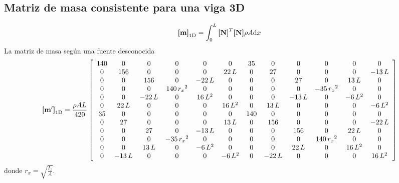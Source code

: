 \subsection*{Matriz de masa consistente para una viga 3D}
  \begin{equation}
  	\boldsymbol{[}\mathbf{m} \boldsymbol{]}_{\mathrm{1D}} = \int_0^L \boldsymbol{[}\mathbf{N} \boldsymbol{]}^T \boldsymbol{[}\mathbf{N} \boldsymbol{]} \rho A \textrm{d} x
  \end{equation}
  La matriz de masa según una fuente desconocida
  \begin{equation}
  	\boldsymbol{[}\mathbf{m'} \boldsymbol{]}_{\mathrm{1D}}= \frac{\rho A L}{420}\left[\begin{array}{cccccccccccc} 140 & 0 & 0 & 0 & 0 & 0 & 35 & 0 & 0 & 0 & 0 & 0\\ 0 & 156 & 0 & 0 & 0 & 22\,L & 0 & 27 & 0 & 0 & 0 & -13\,L\\ 0 & 0 & 156 & 0 & -22\,L & 0 & 0 & 0 & 27 & 0 & 13\,L & 0\\ 0 & 0 & 0 & 140\,{r_{x}}^2 & 0 & 0 & 0 & 0 & 0 & -35\,{r_{x}}^2 & 0 & 0\\ 0 & 0 & -22\,L & 0 & 16\,L^2 & 0 & 0 & 0 & -13\,L & 0 & -6\,L^2 & 0\\ 0 & 22\,L & 0 & 0 & 0 & 16\,L^2 & 0 & 13\,L & 0 & 0 & 0 & -6\,L^2\\ 35 & 0 & 0 & 0 & 0 & 0 & 140 & 0 & 0 & 0 & 0 & 0\\ 0 & 27 & 0 & 0 & 0 & 13\,L & 0 & 156 & 0 & 0 & 0 & -22\,L\\ 0 & 0 & 27 & 0 & -13\,L & 0 & 0 & 0 & 156 & 0 & 22\,L & 0\\ 0 & 0 & 0 & -35\,{r_{x}}^2 & 0 & 0 & 0 & 0 & 0 & 140\,{r_{x}}^2 & 0 & 0\\ 0 & 0 & 13\,L & 0 & -6\,L^2 & 0 & 0 & 0 & 22\,L & 0 & 16\,L^2 & 0\\ 0 & -13\,L & 0 & 0 & 0 & -6\,L^2 & 0 & -22\,L & 0 & 0 & 0 & 16\,L^2 \end{array}\right]	
  \end{equation}
donde $r_x =\sqrt{ \frac{I_z}{A}}$. 


